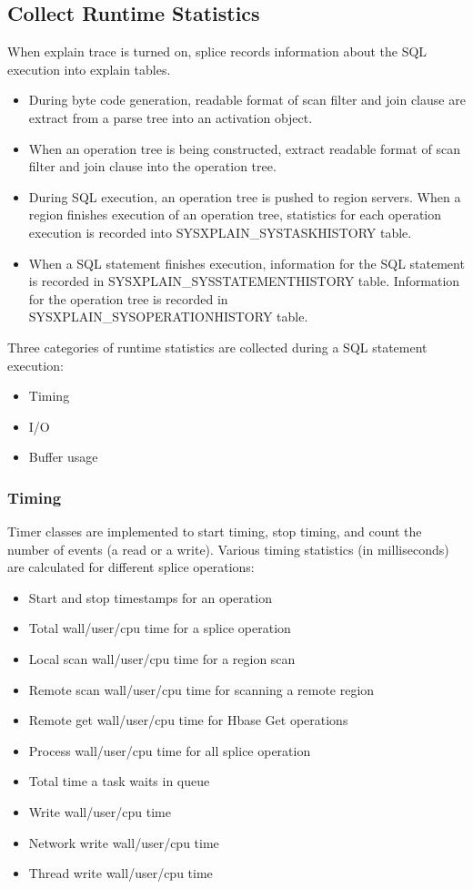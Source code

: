 \documentclass{article}
\begin{document}
\subsection{Collect Runtime Statistics}
When explain trace is turned on, splice records information about the SQL execution into explain tables.
\begin{itemize}
  \item During byte code generation, readable format of scan filter and join clause are extract from a parse tree into an activation object.
  \item When an operation tree is being constructed, extract readable format of scan filter and join clause into the operation tree.
  \item During SQL execution, an operation tree is pushed to region servers. When a region finishes execution of an operation tree, statistics for each operation execution is recorded into SYSXPLAIN\_SYSTASKHISTORY table.
  \item When a SQL statement finishes execution, information for the SQL statement is recorded in SYSXPLAIN\_SYSSTATEMENTHISTORY table. Information for the operation tree is recorded in SYSXPLAIN\_SYSOPERATIONHISTORY table.
\end{itemize}
Three categories of runtime statistics are collected during a SQL statement execution:
\begin{itemize}
  \item Timing
  \item I/O
  \item	Buffer usage
\end{itemize}
\subsubsection{Timing}
Timer classes are implemented to start timing, stop timing, and count the number of events (a read or a write). Various timing statistics (in milliseconds) are calculated for different splice operations:
\begin{itemize}
  \item Start and stop timestamps for an operation
  \item Total wall/user/cpu time for a splice operation
  \item Local scan wall/user/cpu time for a region scan
  \item Remote scan wall/user/cpu time for scanning a remote region
  \item Remote get wall/user/cpu time for Hbase Get operations
  \item Process wall/user/cpu time for all splice operation
  \item Total time a task waits in queue
  \item Write wall/user/cpu time
  \item Network write wall/user/cpu time
  \item Thread write wall/user/cpu time
\end{itemize}
\end{document}
